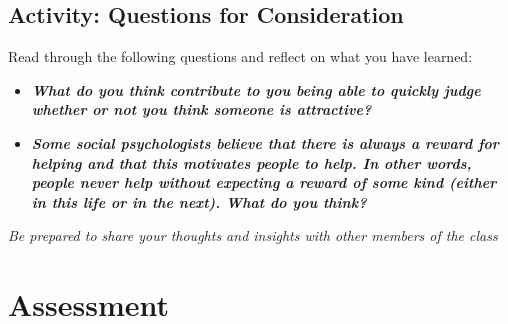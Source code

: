 \documentclass[
]{book}
\providecommand{\tightlist}{%
  \setlength{\itemsep}{0pt}\setlength{\parskip}{0pt}}
\begin{document}
\hypertarget{activity-questions-for-consideration-13}{%
\subsection*{Activity: Questions for Consideration}\label{activity-questions-for-consideration-13}}

\begin{reflect}
Read through the following questions and reflect on what you have learned:

\begin{itemize}
\tightlist
\item
  \textbf{\emph{What do you think contribute to you being able to quickly judge whether or not you think someone is attractive?}}\\
\item
  \textbf{\emph{Some social psychologists believe that there is always a reward for helping and that this motivates people to help. In other words, people never help without expecting a reward of some kind (either in this life or in the next). What do you think?}}
\end{itemize}

\emph{Be prepared to share your thoughts and insights with other members of the class}
\end{reflect}

\hypertarget{assessment-6}{%
\section*{Assessment}\label{assessment-6}}
\end{document}
